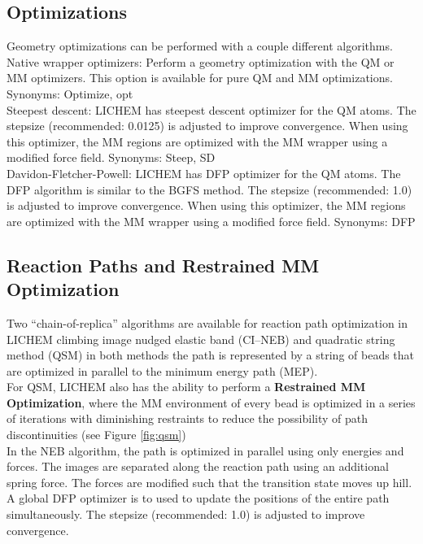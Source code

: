 \documentclass[12pt]{report}
\begin{document}
\subsection{Optimizations}

Geometry optimizations can be performed with a couple different algorithms.
\\

Native wrapper optimizers: Perform a geometry optimization with the QM or
MM optimizers.
This option is available for pure QM and MM optimizations.
Synonyms: Optimize, opt \\

Steepest descent: LICHEM has steepest descent
optimizer \textcolor{red}{\cite{Press2007}}
for the QM
atoms.
The stepsize (recommended: 0.0125) is adjusted to improve convergence.
When using this optimizer, the MM regions are optimized with the MM wrapper
using a modified force field.
Synonyms: Steep, SD \\

Davidon-Fletcher-Powell: LICHEM has DFP
optimizer \textcolor{red}{\cite{Press2007,Sheppard2008_DFP}}
for the QM atoms.
The DFP algorithm is similar to the BGFS method.
The stepsize (recommended: 1.0) is adjusted to improve convergence.
When using this optimizer, the MM regions are optimized with the MM wrapper
using a modified force field.
Synonyms: DFP

\subsection{Reaction Paths and Restrained MM Optimization}

Two ``chain-of-replica'' algorithms are available
for reaction path optimization in LICHEM
climbing image nudged elastic band (CI--NEB)
\textcolor{red}{\cite{NEB2000_A,NEB2000_B}}
and quadratic string method (QSM) \cite{Burger2006}
in both methods the path is represented by a string of beads
that are optimized in parallel to the minimum energy path (MEP). \\

For QSM, LICHEM also has the ability to perform a \textbf{Restrained
MM Optimization}, where the MM environment of every bead is
optimized in a series of iterations with diminishing restraints to
reduce the possibility of path discontinuities (see Figure \ref{fig:qsm})
\cite{Xie2004,AndresCisneros2009} \\

In the NEB algorithm, the path is optimized in parallel using only energies
and forces. The images are separated along the reaction path using
an additional spring force.  The forces
are modified such that the transition state moves up hill.
A global DFP optimizer is to used to update the positions of the entire path
simultaneously.
The stepsize (recommended: 1.0) is adjusted to improve convergence. \\
\end{document}
